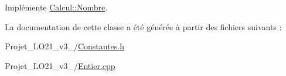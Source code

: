 Implémente \hyperlink{class_calcul_1_1_nombre_a01b0c03ea3d7493e6d853768cce6f096}{Calcul\-::\-Nombre}.



La documentation de cette classe a été générée à partir des fichiers suivants \-:\begin{DoxyCompactItemize}
\item 
Projet\-\_\-\-L\-O21\-\_\-v3\-\_/\hyperlink{_constantes_8h}{Constantes.\-h}\item 
Projet\-\_\-\-L\-O21\-\_\-v3\-\_/\hyperlink{_entier_8cpp}{Entier.\-cpp}\end{DoxyCompactItemize}
